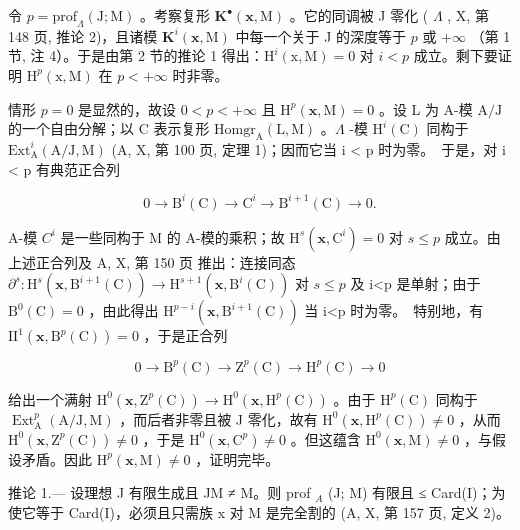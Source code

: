 令 \(p = \text{prof}_{\Lambda}(\text{J}; \text{M})\) 。考察复形 \(\mathbf{K}^{\bullet}(\mathbf{x}, \text{M})\) 。它的同调被 J 零化 ( \(\Lambda\) , X, 第 148 页, 推论 2)，且诸模 \(\mathbf{K}^{i}(\mathbf{x}, \text{M})\) 中每一个关于 J 的深度等于 \(p\) 或 \(+\infty\) （第 1 节, 注 4）。于是由第 2 节的推论 1 得出：\(\text{H}^{i}(\text{x}, \text{M}) = 0\) 对 \(i < p\) 成立。剩下要证明 \(\text{H}^{p}(\text{x}, \text{M})\) 在 \(p < +\infty\) 时非零。

情形 \(p = 0\) 是显然的，故设 \(0 < p < +\infty\) 且 \(\mathrm{H}^p(\mathbf{x},\mathrm{M}) = 0\) 。设 L 为 A-模 \(\mathrm{A / J}\) 的一个自由分解；以 C 表示复形 \(\mathrm{Homgr}_{\mathrm{A}}(\mathrm{L},\mathrm{M})\) 。\(\Lambda\) -模 \(\mathrm{H}^i(\mathrm{C})\) 同构于 \(\mathrm{Ext}_{\mathrm{A}}^i(\mathrm{A / J},\mathrm{M})\) (A, X, 第 100 页, 定理 1)；因而它当 i \textless{} p 时为零。~于是，对 i \textless{} p 有典范正合列

\[
0 \rightarrow \mathrm{B} ^ {i} (\mathrm{C}) \rightarrow \mathrm{C} ^ {i} \rightarrow \mathrm{B} ^ {i + 1} (\mathrm{C}) \rightarrow 0.
\]

A-模 \(C^{i}\) 是一些同构于 M 的 A-模的乘积；故 \(\mathrm{H}^{s}(\mathbf{x},\mathrm{C}^{i})=0\) 对 \(s\leqslant p\) 成立。由上述正合列及 A, X, 第 150 页 推出：连接同态 \(\partial^{s}:\mathrm{H}^{s}(\mathbf{x},\mathrm{B}^{i+1}(\mathrm{C}))\longrightarrow\mathrm{H}^{s+1}(\mathbf{x},\mathrm{B}^{i}(\mathrm{C}))\) 对 \(s\leqslant p\) 及 i\textless p 是单射；由于 \(\mathrm{B}^{0}(\mathrm{C})=0\) ，由此得出 \(\mathrm{H}^{p-i}(\mathbf{x},\mathrm{B}^{i+1}(\mathrm{C}))\) 当 i\textless p 时为零。~特别地，有 \(\mathrm{II}^{1}(\mathbf{x},\mathrm{B}^{p}(\mathrm{C}))=0\) ，于是正合列

\[
0 \to \mathrm{B} ^ {p} (\mathrm{C}) \to \mathrm{Z} ^ {p} (\mathrm{C}) \to \mathrm{H} ^ {p} (\mathrm{C}) \to 0
\]

给出一个满射 \(\mathrm{H}^{0}(\mathbf{x},\mathrm{Z}^{p}(\mathrm{C}))\longrightarrow\mathrm{H}^{0}(\mathbf{x},\mathrm{H}^{p}(\mathrm{C}))\) 。由于 \(\mathrm{H}^{p}(\mathrm{C})\) 同构于 \(\operatorname{Ext}_{\mathrm{A}}^{p}(\mathrm{A}/\mathrm{J},\mathrm{M})\) ，而后者非零且被 J 零化，故有 \(\mathrm{H}^{0}(\mathbf{x},\mathrm{H}^{p}(\mathrm{C}))\neq0\) ，从而 \(\mathrm{H}^{0}(\mathbf{x},\mathrm{Z}^{p}(\mathrm{C}))\neq0\) ，于是 \(\mathrm{H}^{0}(\mathbf{x},\mathrm{C}^{p})\neq0\) 。但这蕴含 \(\mathrm{H}^{0}(\mathbf{x},\mathrm{M})\neq0\) ，与假设矛盾。因此 \(\mathrm{H}^{p}(\mathbf{x},\mathrm{M})\neq0\) ，证明完毕。

推论 1.--- 设理想 J 有限生成且 JM ≠ M。则 prof \(_{A}\) (J; M) 有限且 ≤ Card(I)；为使它等于 Card(I)，必须且只需族 x 对 M 是完全割的 (A, X, 第 157 页, 定义 2)。

